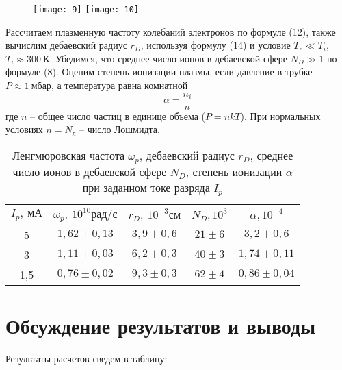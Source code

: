 \begin{figure}[H]
    \begin{floatrow}
        {\texttt{[image: 9]}}
        {\texttt{[image: 10]}}        
    \end{floatrow}
\end{figure}

Рассчитаем
плазменную частоту колебаний электронов
по формуле (12), также вычислим
дебаевский радиус $r_D$, используя
формулу (14) и условие $T_e \ll T_i$,
$T_i \approx 300 \ \text{К}$. Убедимся,
что среднее число ионов в дебаевской
сфере $N_D \gg 1$ по формуле (8). Оценим
степень ионизации плазмы, если давление
в трубке $P \approx 1 \ \text{мбар}$, а
температура равна комнатной
\[
\alpha = \frac{n_i}{n}
\]
где $n$ -- общее число частиц в единице
объема ($P=nkT$). При нормальных
условиях $n = N_\text{л}$ -- число
Лошмидта.

\begin{table}[H]
    \begin{tabular}{|c|c|c|c|c|}
        \hline
        $I_p, \ \text{мА}$ &
        $\omega_p, \ 10^{10}
        \text{рад/с}$ &
        $r_D, \ 10^{-3}\text{см}$ &
        $N_D, 10^3$ & $\alpha, 10^{-4}$\\ \hline
        5 & $ 1,62 \pm 0,13$ & $3,9 \pm
        0,6$ &
        $21 \pm 6$ & $3,2\pm 0,6$ \\ \hline
        3 & $1,11 \pm 0,03$ & $6,2 \pm
        0,3$
          & $40 \pm 3$ & $1,74 \pm 0,11$\\ \hline
        1,5 & $0,76 \pm 0,02$ & $9,3 \pm
        0,3$ & $62 \pm 4$ & $0,86 \pm
        0,04$ \\ \hline
    \end{tabular}
    \captionsetup{justification=centering}
    \caption{Ленгмюровская частота
    $\omega_p$, дебаевский радиус
$r_D$, среднее число ионов в дебаевской
сфере $N_D$, степень ионизации $\alpha$
при заданном токе разряда  $I_p$}
\end{table}

\section{Обсуждение результатов и выводы}
Результаты расчетов сведем в таблицу:


